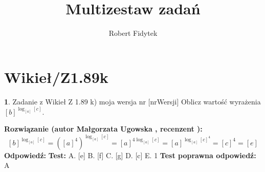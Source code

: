 \documentclass[12pt, a4paper]{article}
\title{Multizestaw zadań}
\author{Robert Fidytek}
\date{}
\theoremstyle{definition} %
\newtheorem{zad}{}
\newcommand{\kategoria}[1]{\section{#1}} %
\newcommand{\zadStart}[1]{\begin{zad}#1\newline} %
\newcommand{\zadStop}{\end{zad}}   %
\newcommand{\rozwStart}[2]{\noindent \textbf{Rozwiązanie (autor #1 , recenzent #2): }\newline} %
\newcommand{\rozwStop}{\newline}                                            %
\newcommand{\odpStart}{\noindent \textbf{Odpowiedź:}\newline}    %
\newcommand{\odpStop}{\newline}                                             %
\newcommand{\testStart}{\noindent \textbf{Test:}\newline} %
\newcommand{\testStop}{\newline} %
\newcommand{\kluczStart}{\noindent \textbf{Test poprawna odpowiedź:}\newline} %
\newcommand{\kluczStop}{\newline} %
\begin{document}
\maketitle


\kategoria{Wikieł/Z1.89k}
\zadStart{Zadanie z Wikieł Z 1.89 k) moja wersja nr [nrWersji]}
Oblicz warto\'sć wyrażenia $[b]^{\log_{[a]}{[c]}}$.
\zadStop
\rozwStart{Małgorzata Ugowska}{}
$$[b]^{\log_{[a]}{[c]}} = ([a]^4)^{\log_{[a]}{[c]}} = [a]^{4\log_{[a]}{[c]}} = [a]^{\log_{[a]}{[c]^4}} =[c]^4 = [e] $$
\rozwStop
\odpStart
[e]
\odpStop
\testStart
A. [e]
B. [f]
C. [g]
D. [c]
E. 1
\testStop
\kluczStart
A
\kluczStop
\end{document}
